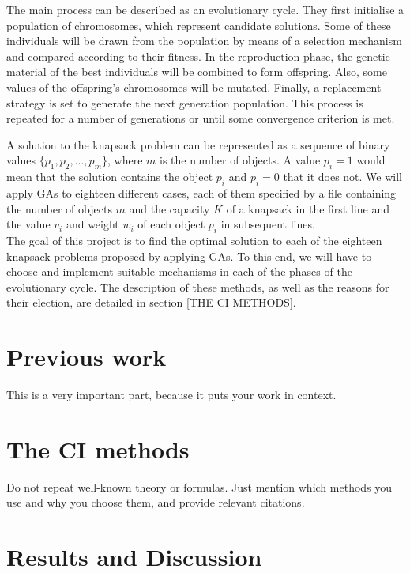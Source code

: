 \documentclass[anon]{CI}
\begin{document}
The main process can be described as an evolutionary cycle. They first initialise a population of chromosomes, which represent candidate solutions. Some of these individuals will be drawn from the population by means of a selection mechanism and compared according to their fitness. In the reproduction phase, the genetic material of the best individuals will be combined to form offspring. Also, some values of the offspring’s chromosomes will be mutated. Finally, a replacement strategy is set to generate the next generation population. This process is repeated for a number of generations or until some convergence criterion is met.

A solution to the knapsack problem can be represented as a sequence of binary values $\{p_1, p_2, ..., p_m\}$, where $m$ is the number of objects. A value $p_i = 1$ would mean that the solution contains the object $p_i$ and $p_i = 0$ that it does not. We will apply GAs to eighteen different cases, each of them specified by a file containing the number of objects $m$ and the capacity $K$ of a knapsack in the first line and the value $v_i$ and weight $w_i$ of each object $p_i$ in subsequent lines. \\

The goal of this project is to find the optimal solution to each of the eighteen knapsack problems proposed by applying GAs. To this end, we will have to choose and implement suitable mechanisms in each of the phases of the evolutionary cycle. The description of these methods, as well as the reasons for their election, are detailed in section  [THE CI METHODS].

\section{Previous work}

This is a very important part, because it puts your work in context.

\section{The CI methods}

Do not repeat well-known theory or formulas. Just mention which methods you use and why you choose them, and provide relevant citations.

\section{Results and Discussion}
\end{document}
